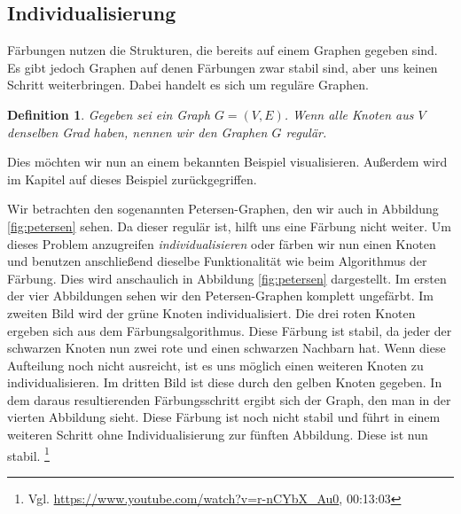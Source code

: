 \documentclass[a4paper]{article}
\newtheorem{definition}{Definition}
\newcommand{\babaivideo}{\url{https://www.youtube.com/watch?v=r-nCYbX_Au0}}
\begin{document}
\subsection{Individualisierung}
Färbungen nutzen die Strukturen, die bereits auf einem Graphen gegeben sind. Es gibt jedoch Graphen auf denen Färbungen zwar stabil sind, aber uns keinen Schritt weiterbringen. Dabei handelt es sich um reguläre Graphen.
\begin{definition}
Gegeben sei ein Graph $G = (V,E)$. Wenn alle Knoten aus $V$ denselben Grad haben, nennen wir den Graphen $G$ regulär.
\end{definition}
Dies möchten wir nun an einem bekannten Beispiel visualisieren. Außerdem wird im Kapitel  auf dieses Beispiel zurückgegriffen. 

Wir betrachten den sogenannten Petersen-Graphen, den wir auch in Abbildung \ref{fig:petersen} sehen. Da dieser regulär ist, hilft uns eine Färbung nicht weiter. Um dieses Problem anzugreifen \emph{individualisieren} oder färben wir nun einen Knoten und benutzen anschließend dieselbe Funktionalität wie beim Algorithmus der Färbung. Dies wird anschaulich in Abbildung \ref{fig:petersen} dargestellt. Im ersten der vier Abbildungen sehen wir den Petersen-Graphen komplett ungefärbt. Im zweiten Bild wird der grüne Knoten individualisiert. Die drei roten Knoten ergeben sich aus dem Färbungsalgorithmus. Diese Färbung ist stabil, da jeder der schwarzen Knoten nun zwei rote und einen schwarzen Nachbarn hat. Wenn diese Aufteilung noch nicht ausreicht, ist es uns möglich einen weiteren Knoten zu individualisieren. Im dritten Bild ist diese durch den gelben Knoten gegeben. In dem daraus resultierenden Färbungsschritt ergibt sich der Graph, den man in der vierten Abbildung sieht. Diese Färbung ist noch nicht stabil und führt in einem weiteren Schritt ohne Individualisierung zur fünften Abbildung. Diese ist nun stabil. \footnote{Vgl. \babaivideo, 00:13:03}
\end{document}
